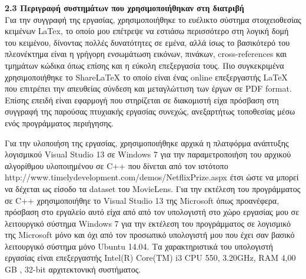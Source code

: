 \documentclass{report}
\begin{document}
\vspace{20mm} 

\textbf{\large{2.3 Περιγραφή συστημάτων που χρησιμοποιήθηκαν στη διατριβή}}
\vspace{2mm}
\\
Για την συγγραφή της εργασίας, χρησιμοποιήθηκε το ευέλικτο σύστημα στοιχειοθεσίας κειμένων \textlatin{LaTex}, το οποίο μου επέτρεψε να εστιάσω περισσότερο στη λογική δομή του κειμένου, δίνοντας πολλές δυνατότητες σε εμένα, αλλά ίσως το βασικότερό του πλεονέκτημα είναι η γρήγορη ενσωμάτωση  εικόνων, πινάκων, \textlatin{cross-references} και τμημάτων κώδικα όπως επίσης και η εύκολη επεξεργασία τους. Πιο συγκεκριμένα χρησιμοποιήθηκε το \textlatin{ShareLaTeX} το οποίο είναι ένας \textlatin{online} επεξεργαστής \textlatin{LaTeX} που επιτρέπει την απευθείας σύνδεση και μεταγλώττιση των έργων σε \textlatin{PDF format}. Επίσης επειδή είναι εφαρμογή που στηρίζεται σε διακομιστή είχα πρόσβαση στη συγγραφή της παρούσας πτυχιακής εργασίας συνεχώς, ανεξαρτήτως τοποθεσίας μέσω ενός προγράμματος περιήγησης.  

Για την υλοποιήση της εργασίας, χρησιμοποιήθηκε αρχικά η πλατφόρμα ανάπτυξης λογισμικού \textlatin{Visual Studio 13} σε \textlatin{Windows 7} για την παραμετροποιήση του αρχικού αλγορίθμου υλοποιημένου σε \textlatin{C++} που δίνεται από τον ιστότοπο \textlatin{http://www.timelydevelopment.com/demos/NetflixPrize.aspx} έτσι ώστε να μπορεί να δέχεται ως είσοδο τα \textlatin{dataset} του \textlatin{MovieLens}. Για την εκτέλεση του προγράμματος σε \textlatin{C++} χρησιμοποιήθηε το \textlatin{Visual Studio 13} της \textlatin{Microsoft} όπως προανέφερα, πρόσβαση στο εργαλείο αυτό είχα από από τον υπολογιστή στο χώρο εργασίας μου σε λειτουργικό σύστημα \textlatin{Windows 7} για την εκτέλεση του προγράμματος σε λογισμικό της \textlatin{Microsoft} μόνο  και όχι από τον προσωπικό υπολογιστή μου που έχει σαν βασικό λειτουργικό σύστημα μόνο \textlatin{Ubuntu} 14.04. Τα χαρακτηριστικά του υπολογιστή εργασίας είναι επεξεργαστής \textlatin{Intel(R) Core(TM) i3 CPU 550, 3.20GHz, RAM 4,00 GB , 32-bit} αρχιτεκτονική συστήματος.
\end{document}
